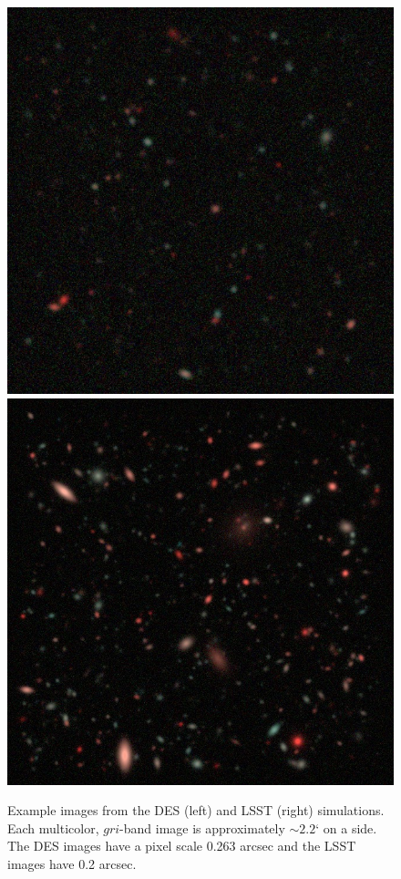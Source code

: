 \documentclass[fleqn,useAMS,usenatbib]{mnras}
\begin{document}
\begin{figure}
    \includegraphics[width=0.9\columnwidth]{figures/des_gri.jpg}
    \includegraphics[width=0.9\columnwidth]{figures/lsst_gri.jpg}
    \caption{
        Example images from the DES (left) and LSST (right) simulations. Each
        multicolor, $gri$-band image is approximately $\sim\!2.2$` on a side. The
        DES images have a pixel scale 0.263 arcsec and the LSST images have 0.2
        arcsec. 
        \label{fig:simimages}}
\end{figure}
\end{document}
